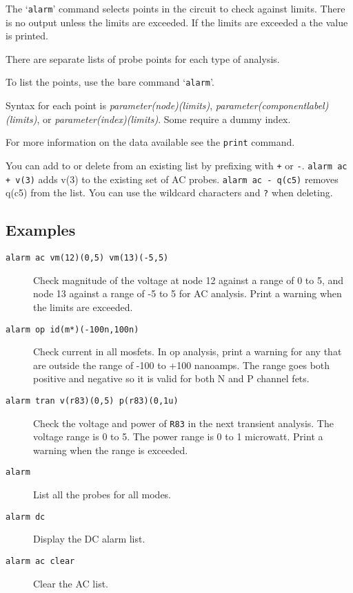 The `{\tt alarm}' command selects points in the circuit to check
against limits.  There is no output unless the limits are exceeded.
If the limits are exceeded a the value is printed.

There are separate lists of probe points for each type of analysis.

To list the points, use the bare command `{\tt alarm}'.

Syntax for each point is {\it parameter(node)(limits)}, {\it
parameter(componentlabel)(limits)}, or {\it
parameter(index)(limits)}. Some require a dummy index.

For more information on the data available see the {\tt print}
command.

You can add to or delete from an existing list by prefixing with
{\tt +} or {\tt -}.  {\tt alarm ac + v(3)} adds v(3) to the existing
set of AC probes.  {\tt alarm ac - q(c5)} removes q(c5) from the
list.  You can use the wildcard characters {\tt *} and {\tt ?} when
deleting.
\subsection{Examples}

\begin{description}

\item[{\tt alarm ac vm(12)(0,5) vm(13)(-5,5)}] Check magnitude of
the voltage at node 12 against a range of 0 to 5, and node 13
against a range of -5 to 5 for AC analysis.  Print a warning when
the limits are exceeded.

\item[{\tt alarm op id(m*)(-100n,100n)}] Check current in all mosfets.
In op analysis, print a warning for any that are outside the range of
-100 to +100 nanoamps.  The range goes both positive and negative so
it is valid for both N and P channel fets.

\item[{\tt alarm tran v(r83)(0,5) p(r83)(0,1u)}] Check the voltage
and power of {\tt R83} in the next transient analysis.  The voltage
range is 0 to 5.  The power range is 0 to 1 microwatt.  Print a
warning when the range is exceeded.

\item[{\tt alarm}] List all the probes for all modes.

\item[{\tt alarm dc}] Display the DC alarm list.

\item[{\tt alarm ac clear}] Clear the AC list.

\end{description}
